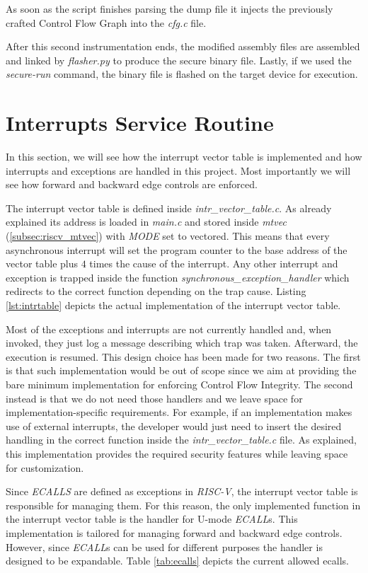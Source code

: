 As soon as the script finishes parsing the dump file it injects the previously crafted
Control Flow Graph into the \textit{cfg.c} file.

After this second instrumentation ends, the modified assembly files are assembled
and linked by \textit{flasher.py} to produce the secure binary file. Lastly, if
we used the \textit{secure-run} command, the binary file is flashed on the
target device for execution.

\section{Interrupts Service Routine}
\label{sec:project_isr}

In this section, we will see how the interrupt vector table is implemented and
how interrupts and exceptions are handled in this project. Most importantly we will
see how forward and backward edge controls are enforced.

The interrupt vector table is defined inside \textit{intr\_vector\_table.c}. As already
explained its address is loaded in \textit{main.c} and stored inside \textit{mtvec}
(\ref{subsec:riscv_mtvec}) with \textit{MODE} set to vectored. This means that every
asynchronous interrupt will set the program counter to the base address of the vector
table plus $4$ times the cause of the interrupt. Any other interrupt and
exception is trapped inside the function \textit{synchronous\_exception\_handler}
which redirects to the correct function depending on the trap cause. Listing
\ref{lst:intrtable} depicts the actual implementation of the interrupt vector
table.

Most of the exceptions and interrupts are not currently handled and, when invoked,
they just log a message describing which trap was taken. Afterward, the
execution is resumed. This design choice has been made for two reasons. The
first is that such implementation would be out of scope since we aim at
providing the bare minimum implementation for enforcing Control Flow Integrity. The
second instead is that we do not need those handlers and we leave space for implementation-specific
requirements. For example, if an implementation makes use of external interrupts,
the developer would just need to insert the desired handling in the correct
function inside the \textit{intr\_vector\_table.c} file. As explained, this implementation
provides the required security features while leaving space for customization.

Since \textit{ECALLS} are defined as exceptions in \textit{RISC-V}, the
interrupt vector table is responsible for managing them. For this reason, the
only implemented function in the interrupt vector table is the handler for U-mode
\textit{ECALL}s. This implementation is tailored for managing forward and backward
edge controls. However, since \textit{ECALL}s can be used for different purposes
the handler is designed to be expandable. Table \ref{tab:ecalls} depicts the
current allowed ecalls.

